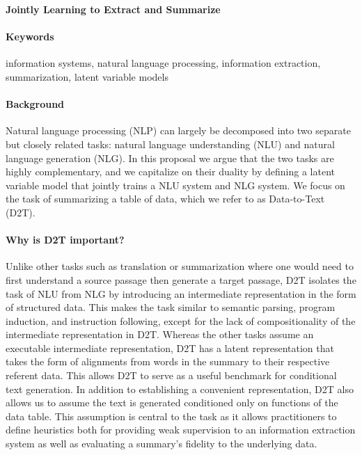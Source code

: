 \documentclass[11pt]{article}
\begin{document}

\begin{center}
\textbf{Jointly Learning to Extract and Summarize}
\end{center}

\paragraph{Keywords}
information systems, natural language processing, information extraction,
summarization, latent variable models

\paragraph{Background}
Natural language processing (NLP) can largely be decomposed into two separate but
closely related tasks: natural language understanding (NLU) and natural language
generation (NLG).
In this proposal we argue that the two tasks are highly complementary,
and we capitalize on their duality by defining a latent variable model
that jointly trains a NLU system and NLG system.
We focus on the task of summarizing a table of data,
which we refer to as Data-to-Text (D2T).

\paragraph{Why is D2T important?}
Unlike other tasks such as translation or summarization where one would
need to first understand a source passage then generate a target passage,
D2T isolates the task of NLU from NLG by introducing an intermediate representation in
the form of structured data.
This makes the task similar to semantic parsing, program induction, and instruction following,
except for the lack of compositionality of the intermediate representation in D2T.
Whereas the other tasks assume an executable intermediate representation,
D2T has a latent representation that takes the form of alignments from 
words in the summary to their respective referent data.
This allows D2T to serve as a useful benchmark for conditional text generation.
In addition to establishing a convenient representation,
D2T also allows us to assume the text is generated conditioned only on
functions of the data table.
This assumption is central to the task as it allows
practitioners to define heuristics both for providing weak supervision to an
information extraction system as well as evaluating a summary's fidelity
to the underlying data.
\end{document}

